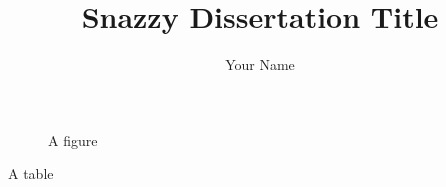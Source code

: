 \documentclass[12pt]{report}
\title{Snazzy Dissertation Title}
\author{Your Name}
\begin{document}






\newpage
\begin{singlespacing}
\tableofcontents
\end{singlespacing}
\newpage
\listoftables
\newpage
\listoffigures 
\newpage
 
\newpage
{} 




\begin{figure}[h]
  \centering
  \caption{A figure}
  \label{fig:figure}
\end{figure}

\begin{table}
  \centering
  \caption{A table}
  \label{tab:table}
\end{table}



\begin{appendices}

\end{appendices}

\singlespacing%
\nocite{*}      %

\end{document}
